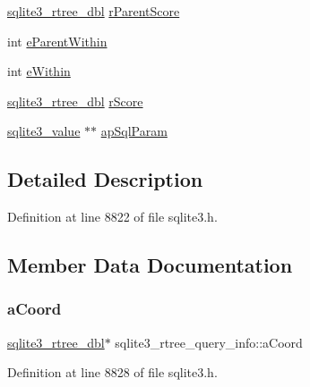 \begin{DoxyCompactItemize}
\item 
\mbox{\hyperlink{sqlite3_8h_ae9156ff58620c1ceae9391f1afabae1b}{sqlite3\+\_\+rtree\+\_\+dbl}} \mbox{\hyperlink{structsqlite3__rtree__query__info_af7da93e7fc405eec7e7ec90ab237eab2}{r\+Parent\+Score}}
\item 
int \mbox{\hyperlink{structsqlite3__rtree__query__info_a8bd37c6af5427c35830f674a4db682c3}{e\+Parent\+Within}}
\item 
int \mbox{\hyperlink{structsqlite3__rtree__query__info_ad1038309f7ea55472a7ff99bf4f9d514}{e\+Within}}
\item 
\mbox{\hyperlink{sqlite3_8h_ae9156ff58620c1ceae9391f1afabae1b}{sqlite3\+\_\+rtree\+\_\+dbl}} \mbox{\hyperlink{structsqlite3__rtree__query__info_af449e4a3607573d17b3d31c67b6e1584}{r\+Score}}
\item 
\mbox{\hyperlink{sqlite3_8h_ac2fa1ecdb2290d9af6010edbd1cbc83c}{sqlite3\+\_\+value}} $\ast$$\ast$ \mbox{\hyperlink{structsqlite3__rtree__query__info_a57ccb3cce45dd946e5184b5addeb0326}{ap\+Sql\+Param}}
\end{DoxyCompactItemize}


\subsection{Detailed Description}


Definition at line 8822 of file sqlite3.\+h.



\subsection{Member Data Documentation}
\mbox{\label{structsqlite3__rtree__query__info_a9d6e605e62fcf49d57dfc0d192076542}} 
\subsubsection{\texorpdfstring{a\+Coord}{aCoord}}
{\footnotesize\ttfamily \mbox{\hyperlink{sqlite3_8h_ae9156ff58620c1ceae9391f1afabae1b}{sqlite3\+\_\+rtree\+\_\+dbl}}$\ast$ sqlite3\+\_\+rtree\+\_\+query\+\_\+info\+::a\+Coord}



Definition at line 8828 of file sqlite3.\+h.

